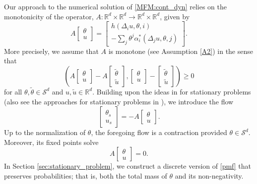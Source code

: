 \documentclass[12pt]{amsart}
\newcommand{\Rr}{{\mathbb{R}}}
\newcommand{\1}{{\chi}}
\newcommand{\Ss}{\mathcal{S}}
\theoremstyle{definition}
\begin{document}
Our approach to the numerical solution of \eqref{MFM:cont_dyn} relies on the monotonicity of the operator, $A:\Rr^d\times\Rr^d\to \Rr^d\times \Rr^d$, 
given by
\begin{equation}
\label{opa}
A\left[
\begin{array}{c}
\theta\\
u
\end{array}\right]
=
\left[
\begin{array}{c}
h(\Delta_i u,\theta,i)\\
-\sum_{j} \theta^j \alpha^*_i(\Delta_j u,\theta,j) 
\end{array}
\right].                        
\end{equation} 
More precisely, we assume 
that $A$ is monotone (see Assumption \ref{A2}) in the sense that
\[
\left(
A\left[
\begin{array}{c}
\theta\\
u
\end{array}\right]-
A\left[
\begin{array}{c}
\tilde \theta\\
\tilde u
\end{array}\right],
\left[
\begin{array}{c}
\theta\\
u
\end{array}\right]
-
\left[
\begin{array}{c}
\tilde \theta\\
\tilde u
\end{array}\right]
\right)\geq 0
\]
for all $\theta, \tilde \theta\in \Ss^d$ and $u, \tilde u\in \Rr^d$. 
Building upon the ideas in \cite{AFG} for stationary problems (also see the approaches for stationary problems in
\cite{MR3420414,FS, AMFS, MR3597009}), 
we introduce the flow
\begin{equation}
\label{pmf}
\left[
\begin{array}{c}
\theta_s\\
u_s
\end{array}\right]
=-A\left[
\begin{array}{c}
\theta\\
u
\end{array}\right].  
\end{equation}
Up to the normalization of $\theta$, the foregoing flow is a contraction provided $\theta\in \Ss^d$. Moreover, its fixed points solve
\[
A\left[
\begin{array}{c}
\theta\\
u
\end{array}\right]=0.
\]
In Section \ref{sec:stationary_problem}, we construct a discrete version of \eqref{pmf} that preserves probabilities; 
that is, both the total mass of $\theta$ and its non-negativity. 
\end{document}
